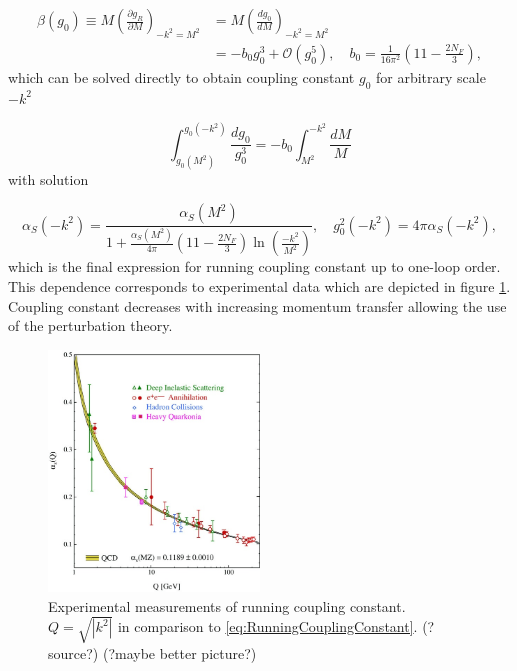 \documentclass[a4paper,11pt]{report}
\begin{document}
\begin{align}
  \beta(g_0) \equiv M \left( \frac{\partial g_R}{\partial M} \right)_{-k^2=M^2}
  &= M \left( \frac{dg_0}{dM} \right)_{-k^2=M^2}
  \label{eq:BetaFunction1} \\
  &= -b_0 g_0^3 + \mathscr{O}(g_0^5)
  , \quad b_0 = \frac{1}{16\pi^2}\left(11-\frac{2N_F}{3}\right),
  \label{eq:BetaFunction2}
\end{align}
which can be solved directly to obtain coupling constant $g_0$ for arbitrary
scale $-k^2$

\begin{equation}
  \int_{g_0(M^2)}^{g_0(-k^2)} \frac{dg_0}{g_0^3} =
  -b_0 \int_{M^2}^{-k^2}\frac{dM}{M}
  \label{eq:RunningCouplingConstantIntegralEquation}
\end{equation}
with solution

\begin{equation}
  \alpha_S(-k^2) = \frac{\alpha_S(M^2)}{1 + \frac{\alpha_S(M^2)}{4\pi} \left(
  11-\frac{2N_F}{3} \right) \ln \left( \frac{-k^2}{M^2} \right) }
  , \quad g_0^2(-k^2) = 4 \pi \alpha_S( -k^2 ),
  \label{eq:RunningCouplingConstant}
\end{equation}
which is the final expression for running coupling constant up to one-loop
order. This dependence corresponds to experimental data which are depicted in
figure \ref{fig:RunningCouplingConstant}. Coupling constant decreases with
increasing momentum transfer allowing the use of the perturbation theory.

\begin{figure}[t]
  \centering
  \includegraphics[width=0.5\textwidth]{Chapter1/RunningCouplingConstant.jpg}
  \caption{Experimental measurements of running coupling constant.
    $Q=\sqrt{\left|k^2\right|}$ in comparison to
    \eqref{eq:RunningCouplingConstant}. (?source?) (?maybe better picture?)}
  \label{fig:RunningCouplingConstant}
\end{figure}
\end{document}
